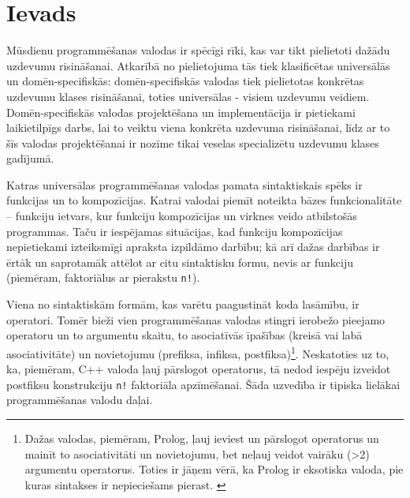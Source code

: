 \section*{Ievads}
\label{s:introduction}

Mūsdienu programmēšanas valodas ir spēcīgi rīki, kas var tikt pielietoti dažādu uzdevumu risināšanai. Atkarībā no pielietojuma tās tiek klasificētas universālās un domēn-specifiskās: domēn-specifiskās valodas tiek pielietotas konkrētas uzdevumu klases risināšanai, toties universālas - visiem uzdevumu veidiem. Domēn-specifiskās valodas projektēšana un implementācija ir pietiekami laikietilpīgs darbs, lai to veiktu viena konkrēta uzdevuma risināšanai, līdz ar to šīs valodas projektēšanai ir nozīme tikai veselas specializētu uzdevumu klases gadījumā.

Katras universālas programmēšanas valodas pamata sintaktiskais spēks ir funkcijas un to kompozīcijas. Katrai valodai piemīt noteikta bāzes funkcionalitāte  – funkciju ietvars, kur funkciju kompozīcijas un virknes veido atbilstošās programmas. Taču ir iespējamas situācijas, kad funkciju kompozīcijas nepietiekami izteiksmīgi apraksta izpildāmo darbību; kā arī dažas darbības ir ērtāk un saprotamāk attēlot ar citu sintaktisku formu, nevis ar funkciju (piemēram, faktoriālus ar pierakstu \verb|n!|).

Viena no sintaktiskām formām, kas varētu paagustināt koda lasāmību, ir operatori. Tomēr bieži vien programmēšanas valodas stingri ierobežo pieejamo operatoru un to argumentu skaitu, to asociatīvās īpašības (kreisā vai labā asociativitāte) un novietojumu (prefiksa, infiksa, postfiksa)\footnote{Dažas valodas, piemēram, Prolog, ļauj ieviest un pārslogot operatorus un mainīt to asociativitāti un novietojumu, bet neļauj veidot vairāku (>2) argumentu operatorus. Toties ir jāņem vērā, ka Prolog ir eksotiska valoda, pie kuras sintakses ir nepieciešams pierast. \cite{PrologStandard}}. Neskatoties uz to, ka, piemēram, C++ valoda ļauj pārslogot operatorus, tā nedod iespēju izveidot postfiksu konstrukciju \verb|n!| faktoriāla apzīmēšanai. Šāda uzvedība ir tipiska lielākai programmēšanas valodu  daļai. %


